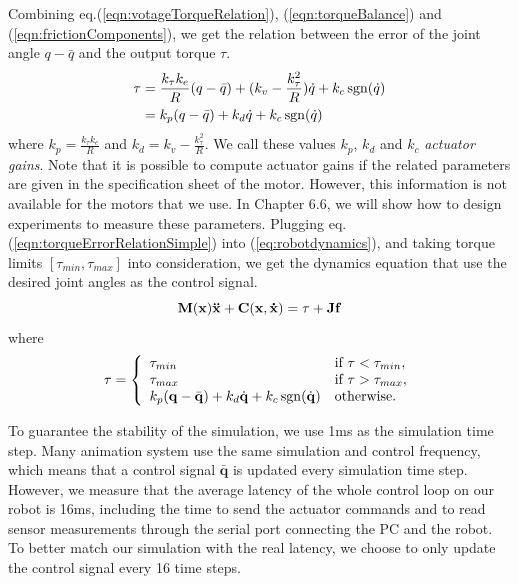 Combining eq.(\ref{eqn:votageTorqueRelation}), (\ref{eqn:torqueBalance}) and (\ref{eqn:frictionComponents}), we get the relation between the error of the joint angle $q-\bar{q}$ and the output torque $\tau$.
\begin{align}
\nonumber  \tau & = \frac{k_{\tau}k_e}{R}(q-\bar{q})+(k_v-\frac{k_{\tau}^2}{R})\dot{q}+k_c\operatorname{sgn}(\dot{q})\\
\nonumber & = k_p(q-\bar{q}) + k_d\dot{q} + k_c\operatorname{sgn}(\dot{q})\\
  \label{eqn:torqueErrorRelationSimple}
\end{align}
where $k_p=\frac{k_{\tau}k_e}{R}$ and $k_d=k_v-\frac{k_{\tau}^2}{R}$. We call these values $k_p$, $k_d$ and $k_c$ \emph{actuator gains}. Note that it is possible to compute actuator gains if the related parameters are given in the specification sheet of the motor. However, this information is not available for the motors that we use. In Chapter 6.6, we will show how to design experiments to measure these parameters. Plugging eq.(\ref{eqn:torqueErrorRelationSimple}) into (\ref{eq:robotdynamics}), and taking torque limits $[\tau_{min}, \tau_{max}]$ into consideration, we get the dynamics equation that use the desired joint angles as the control signal.
\begin{displaymath}
 \mathbf{M}(\mathbf{x})\mathbf{\ddot{x}}+\mathbf{C}(\mathbf{x},\mathbf{\dot{x}}) = \tau+\mathbf{Jf} \\
  \end{displaymath}
where 
\begin{displaymath}\tau =
  \left\{
    \begin{array}{ll}
      \tau_{min} & \text{if }\tau < \tau_{min},\\
      \tau_{max} & \text{if }\tau > \tau_{max},\\
      k_p(\mathbf{q}-\bar{\mathbf{q}}) + k_d\dot{\mathbf{q}} + k_c\operatorname{sgn}(\dot{\mathbf{q}}) & \text{otherwise.}\\
    \end{array}
  \right.
  \label{eqn:robotDynamicsControl}
\end{displaymath}

To guarantee the stability of the simulation, we use 1ms as the simulation time step. Many animation system use the same simulation and control frequency, which means that a control signal $\bar{\mathbf{q}}$ is updated every simulation time step. However, we measure that the average latency of the whole control loop on our robot is 16ms, including the time to send the actuator commands and to read sensor measurements through the serial port connecting the PC and the robot. To better match our simulation with the real latency, we choose to only update the control signal every 16 time steps.

